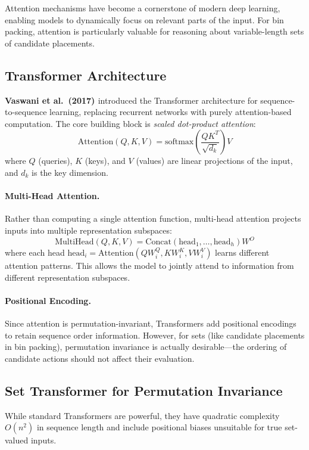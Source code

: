 Attention mechanisms have become a cornerstone of modern deep learning, enabling models to dynamically focus on relevant parts of the input. For bin packing, attention is particularly valuable for reasoning about variable-length sets of candidate placements.

\subsection{Transformer Architecture}

\textbf{Vaswani et al.\ (2017) \cite{VSP+17}} introduced the Transformer architecture for sequence-to-sequence learning, replacing recurrent networks with purely attention-based computation. The core building block is \textit{scaled dot-product attention}:
\[
\text{Attention}(Q, K, V) = \text{softmax}\left(\frac{QK^T}{\sqrt{d_k}}\right) V
\]
where $Q$ (queries), $K$ (keys), and $V$ (values) are linear projections of the input, and $d_k$ is the key dimension.

\paragraph{Multi-Head Attention.}
Rather than computing a single attention function, multi-head attention projects inputs into multiple representation subspaces:
\[
\text{MultiHead}(Q, K, V) = \text{Concat}(\text{head}_1, \ldots, \text{head}_h) W^O
\]
where each head $\text{head}_i = \text{Attention}(QW_i^Q, KW_i^K, VW_i^V)$ learns different attention patterns. This allows the model to jointly attend to information from different representation subspaces.

\paragraph{Positional Encoding.}
Since attention is permutation-invariant, Transformers add positional encodings to retain sequence order information. However, for sets (like candidate placements in bin packing), permutation invariance is actually desirable---the ordering of candidate actions should not affect their evaluation.

\subsection{Set Transformer for Permutation Invariance}

While standard Transformers are powerful, they have quadratic complexity $O(n^2)$ in sequence length and include positional biases unsuitable for true set-valued inputs.

